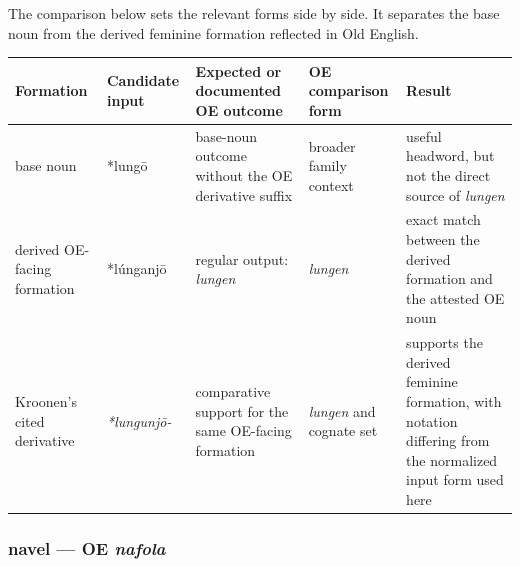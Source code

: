 \documentclass[
  british,
  a4paper,
]{article}
\newcounter{none} %
\begin{document}
The comparison below sets the relevant forms side by side. It separates
the base noun from the derived feminine formation reflected in Old
English.

{\def\LTcaptype{none} %
\begin{longtable}[]{@{}
  >{\raggedright\arraybackslash}p{}
  >{\raggedright\arraybackslash}p{}
  >{\raggedright\arraybackslash}p{}
  >{\raggedright\arraybackslash}p{}
  >{\raggedright\arraybackslash}p{}@{}}
\toprule\noalign{}
\begin{minipage}[b]{\linewidth}\raggedright
Formation
\end{minipage} & \begin{minipage}[b]{\linewidth}\raggedright
Candidate input
\end{minipage} & \begin{minipage}[b]{\linewidth}\raggedright
Expected or documented OE outcome
\end{minipage} & \begin{minipage}[b]{\linewidth}\raggedright
OE comparison form
\end{minipage} & \begin{minipage}[b]{\linewidth}\raggedright
Result
\end{minipage} \\
\midrule\noalign{}
\endhead
\bottomrule\noalign{}
\endlastfoot
base noun & *lungō & base-noun outcome without the OE derivative suffix
& broader family context & useful headword, but not the direct source of
\emph{lungen} \\
derived OE-facing formation & *lúnganjō & regular output: \emph{lungen}
& \emph{lungen} & exact match between the derived formation and the
attested OE noun \\
Kroonen's cited derivative & \emph{*lungunjō-} & comparative support for
the same OE-facing formation & \emph{lungen} and cognate set & supports
the derived feminine formation, with notation differing from the
normalized input form used here \\
\end{longtable}
}

\subsubsection{\texorpdfstring{navel --- OE
\emph{nafola}}{navel --- OE nafola}}\label{navel-oe-nafola}
\end{document}
